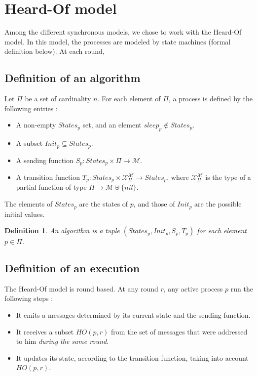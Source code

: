 \documentclass{article}
\newtheorem{definition}{Definition}
\begin{document}
\section{Heard-Of model}

Among the different synchronous models, we chose to work with the Heard-Of model.
In this model, the processes are modeled by state machines (formal definition below).
At each round, 

\subsection{Definition of an algorithm}

Let $\Pi$ be a set of cardinality $n$. For each element of $\Pi$, a process is defined by the following entries :

\begin{itemize}
	\item A non-empty $States_p$ set, and an element $sleep_p \notin States_p$.
	\item A subset $Init_p \subseteq States_p$.
	\item A sending function $S_p : States_p \times \Pi \rightarrow \mathcal{M}$.
	\item A transition function $T_p : States_p \times \mathcal{X}_\Pi^{\mathcal{M}} \rightarrow States_p$,
		where $\mathcal{X}_\Pi^{\mathcal{M}}$ is the type of a partial function
		of type $\Pi \rightarrow \mathcal{M} \uplus \{nil\}$.
\end{itemize}

The elements of $States_p$ are the states of $p$, and those of $Init_p$ are the possible initial values.

\begin{definition}
	An algorithm is a tuple $(States_p, Init_p, S_p, T_p)$ for each element $p \in \Pi$.
\end{definition}


\subsection{Definition of an execution}

The Heard-Of model is round based. At any round $r$, any active process $p$ run the following steps :

\begin{itemize}
	\item It emits a messages determined by its current state and the sending function.
	\item It receives a subset $HO(p,r)$ from the set of messages that were addressed to him
		\textit{during the same round}.
	\item It updates its state, according to the transition function, taking into account $HO(p,r)$.
\end{itemize}
\end{document}
